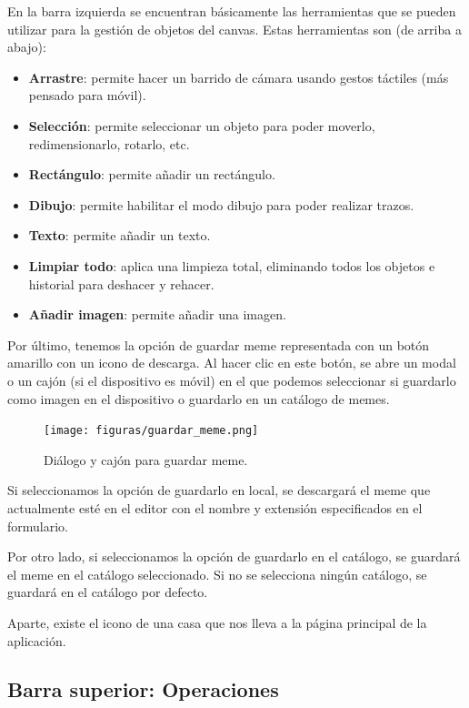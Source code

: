 En la barra izquierda se encuentran básicamente las herramientas que se pueden utilizar para la gestión de objetos del canvas. Estas herramientas son (de arriba a abajo):

\begin{itemize}
    \item \textbf{Arrastre}: permite hacer un barrido de cámara usando gestos táctiles (más pensado para móvil).
    \item \textbf{Selección}: permite seleccionar un objeto para poder moverlo, redimensionarlo, rotarlo, etc.
    \item \textbf{Rectángulo}: permite añadir un rectángulo.
    \item \textbf{Dibujo}: permite habilitar el modo dibujo para poder realizar trazos.
    \item \textbf{Texto}: permite añadir un texto.
    \item \textbf{Limpiar todo}: aplica una limpieza total, eliminando todos los objetos e historial para deshacer y rehacer.
    \item \textbf{Añadir imagen}: permite añadir una imagen.
\end{itemize}

Por último, tenemos la opción de guardar meme representada con un botón amarillo con un icono de descarga. Al hacer clic en este botón, se abre un modal o un cajón (si el dispositivo es móvil) en el que podemos seleccionar si guardarlo como imagen en el dispositivo o guardarlo en un catálogo de memes.

\begin{figure}[H]
    \caption{Diálogo y cajón para guardar meme.}
    \centering
    \vspace*{0.5cm}
    \texttt{[image: figuras/guardar\_meme.png]}
\end{figure}

Si seleccionamos la opción de guardarlo en local, se descargará el meme que actualmente esté en el editor con el nombre y extensión especificados en el formulario.

Por otro lado, si seleccionamos la opción de guardarlo en el catálogo, se guardará el meme en el catálogo seleccionado. Si no se selecciona ningún catálogo, se guardará en el catálogo por defecto.

Aparte, existe el icono de una casa que nos lleva a la página principal de la aplicación.

\subsection{Barra superior: Operaciones}

